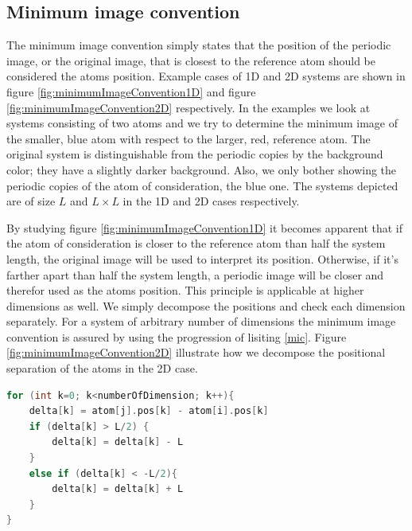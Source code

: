 \documentclass[twoside,english]{uiofysmaster}
\begin{document}
\subsection{Minimum image convention}
The minimum image convention simply states that the position of the periodic image, or the original image, that is closest to the reference atom should be considered the atoms position. 
Example cases of 1D and 2D systems are shown in figure \ref{fig:minimumImageConvention1D} and figure \ref{fig:minimumImageConvention2D} respectively. 
In the examples we look at systems consisting of two atoms and we try to determine the minimum image of the smaller, blue atom with respect to the larger, red, reference atom. 
The original system is distinguishable from the periodic copies by the background color; they have a slightly darker background. 
Also, we only bother showing the periodic copies of the atom of consideration, the blue one.  
The systems depicted are of size $L$ and $L\times L$ in the 1D and 2D cases respectively.

By studying figure \ref{fig:minimumImageConvention1D} it becomes apparent that if the atom of consideration is closer to the reference atom than half the system length, the original image will be used to interpret its position. 
Otherwise, if it's farther apart than half the system length, a periodic image will be closer and therefor used as the atoms position.  
This principle is applicable at higher dimensions as well. We simply decompose the positions and check each dimension separately. For a system of arbitrary number of dimensions the minimum image convention is assured by using the progression of lisiting \ref{mic}. 
Figure \ref{fig:minimumImageConvention2D} illustrate how we decompose the positional separation of the atoms in the 2D case.

\begin{lstlisting}[caption={Loop to compute the position of the closest periodic image of atom $j$ with respect to the reference atom $i$.}, label={mic}, language=c++]
for (int k=0; k<numberOfDimension; k++){
	delta[k] = atom[j].pos[k] - atom[i].pos[k]
	if (delta[k] > L/2) {
		delta[k] = delta[k] - L
	}
	else if (delta[k] < -L/2){
		delta[k] = delta[k] + L
	}
}
\end{lstlisting}
\end{document}
